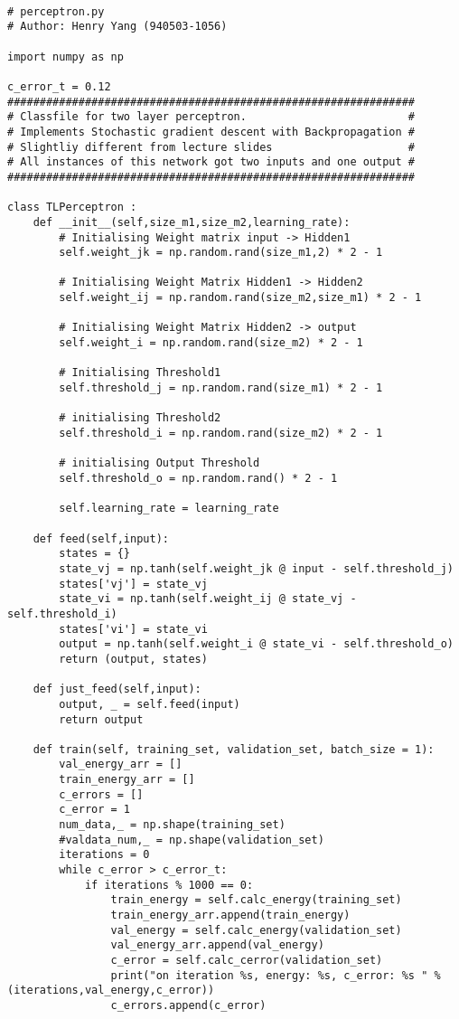 \begin{verbatim}

# perceptron.py
# Author: Henry Yang (940503-1056)

import numpy as np

c_error_t = 0.12
###############################################################
# Classfile for two layer perceptron.                         #
# Implements Stochastic gradient descent with Backpropagation #
# Slightliy different from lecture slides                     # 
# All instances of this network got two inputs and one output #
############################################################### 

class TLPerceptron :
    def __init__(self,size_m1,size_m2,learning_rate):
        # Initialising Weight matrix input -> Hidden1
        self.weight_jk = np.random.rand(size_m1,2) * 2 - 1

        # Initialising Weight Matrix Hidden1 -> Hidden2
        self.weight_ij = np.random.rand(size_m2,size_m1) * 2 - 1

        # Initialising Weight Matrix Hidden2 -> output
        self.weight_i = np.random.rand(size_m2) * 2 - 1

        # Initialising Threshold1
        self.threshold_j = np.random.rand(size_m1) * 2 - 1
        
        # initialising Threshold2
        self.threshold_i = np.random.rand(size_m2) * 2 - 1

        # initialising Output Threshold
        self.threshold_o = np.random.rand() * 2 - 1

        self.learning_rate = learning_rate

    def feed(self,input):
        states = {}
        state_vj = np.tanh(self.weight_jk @ input - self.threshold_j)
        states['vj'] = state_vj
        state_vi = np.tanh(self.weight_ij @ state_vj - self.threshold_i)
        states['vi'] = state_vi
        output = np.tanh(self.weight_i @ state_vi - self.threshold_o)
        return (output, states)
    
    def just_feed(self,input):
        output, _ = self.feed(input)
        return output

    def train(self, training_set, validation_set, batch_size = 1):
        val_energy_arr = []
        train_energy_arr = []
        c_errors = []
        c_error = 1
        num_data,_ = np.shape(training_set)
        #valdata_num,_ = np.shape(validation_set)
        iterations = 0
        while c_error > c_error_t:
            if iterations % 1000 == 0:
                train_energy = self.calc_energy(training_set)
                train_energy_arr.append(train_energy)
                val_energy = self.calc_energy(validation_set)
                val_energy_arr.append(val_energy)
                c_error = self.calc_cerror(validation_set)
                print("on iteration %s, energy: %s, c_error: %s " % (iterations,val_energy,c_error))
                c_errors.append(c_error)
            

\end{verbatim}
